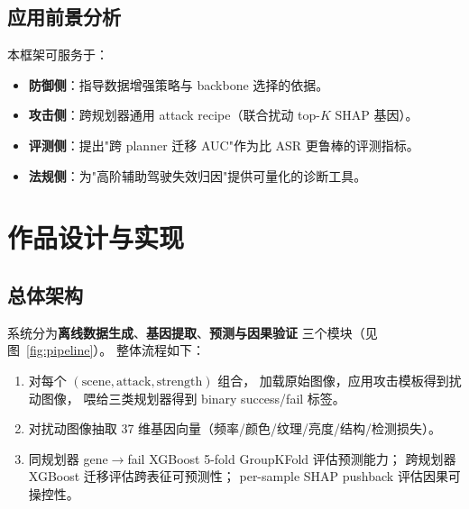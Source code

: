 \documentclass[a4paper,12pt,fontset=fandol]{ctexart}
\begin{document}
\subsection{应用前景分析}

本框架可服务于：
\begin{itemize}
\item \textbf{防御侧}：指导数据增强策略与 backbone 选择的依据。
\item \textbf{攻击侧}：跨规划器通用 attack recipe（联合扰动 top-$K$ SHAP 基因）。
\item \textbf{评测侧}：提出"跨 planner 迁移 AUC"作为比 ASR 更鲁棒的评测指标。
\item \textbf{法规侧}：为"高阶辅助驾驶失效归因"提供可量化的诊断工具。
\end{itemize}

\newpage
\section{作品设计与实现}

\subsection{总体架构}

系统分为\textbf{离线数据生成}、\textbf{基因提取}、\textbf{预测与因果验证}
三个模块（见图~\ref{fig:pipeline}）。
整体流程如下：
\begin{enumerate}[leftmargin=*]
\item 对每个 $(\text{scene}, \text{attack}, \text{strength})$ 组合，
      加载原始图像，应用攻击模板得到扰动图像，
      喂给三类规划器得到 binary success/fail 标签。
\item 对扰动图像抽取 37 维基因向量（频率/颜色/纹理/亮度/结构/检测损失）。
\item 同规划器 gene$\to$fail XGBoost 5-fold GroupKFold 评估预测能力；
      跨规划器 XGBoost 迁移评估跨表征可预测性；
      per-sample SHAP pushback 评估因果可操控性。
\end{enumerate}
\end{document}
